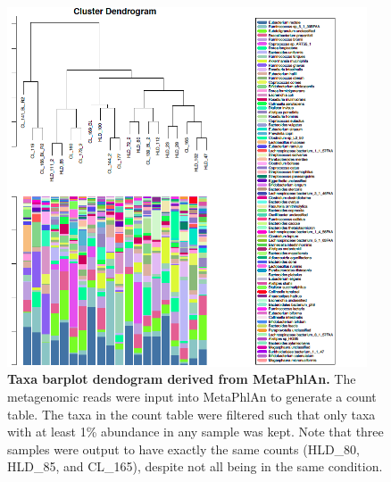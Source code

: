 \begin{figure}[h]
\begin{center}
\includegraphics[width=0.95\textwidth]{metaphlan_barplot_dendogram.png}
\caption{\textbf{Taxa barplot dendogram derived from MetaPhlAn.} The metagenomic reads were input into MetaPhlAn to generate a count table. The taxa in the count table were filtered such that only taxa with at least 1\% abundance in any sample was kept. Note that three samples were output to have exactly the same counts (HLD\_80, HLD\_85, and CL\_165), despite not all being in the same condition.}
\end{center}
\label{nafld_metaphlan_barplot}
\end{figure}

